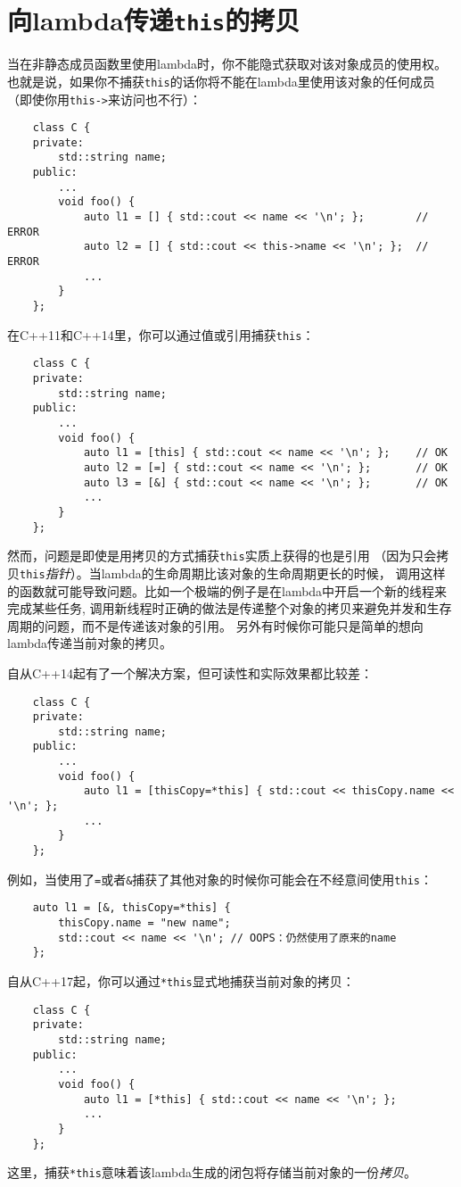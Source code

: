 \section{向lambda传递\texttt{this}的拷贝}
当在非静态成员函数里使用lambda时，你不能隐式获取对该对象成员的使用权。
也就是说，如果你不捕获\texttt{this}的话你将不能在lambda里使用该对象的任何成员
（即使你用\texttt{this->}来访问也不行）：
\begin{lstlisting}
    class C {
    private:
        std::string name;
    public:
        ...
        void foo() {
            auto l1 = [] { std::cout << name << '\n'; };        // ERROR
            auto l2 = [] { std::cout << this->name << '\n'; };  // ERROR
            ...
        }
    };
\end{lstlisting}
在C++11和C++14里，你可以通过值或引用捕获\texttt{this}：
\begin{lstlisting}
    class C {
    private:
        std::string name;
    public:
        ...
        void foo() {
            auto l1 = [this] { std::cout << name << '\n'; };    // OK
            auto l2 = [=] { std::cout << name << '\n'; };       // OK
            auto l3 = [&] { std::cout << name << '\n'; };       // OK
            ...
        }
    };
\end{lstlisting}
然而，问题是即使是用拷贝的方式捕获\texttt{this}实质上获得的也是引用
（因为只会拷贝\texttt{this}\emph{指针}）。当lambda的生命周期比该对象的生命周期更长的时候，
调用这样的函数就可能导致问题。比如一个极端的例子是在lambda中开启一个新的线程来完成某些任务,
调用新线程时正确的做法是传递整个对象的拷贝来避免并发和生存周期的问题，而不是传递该对象的引用。
另外有时候你可能只是简单的想向lambda传递当前对象的拷贝。

自从C++14起有了一个解决方案，但可读性和实际效果都比较差：
\begin{lstlisting}
    class C {
    private:
        std::string name;
    public:
        ...
        void foo() {
            auto l1 = [thisCopy=*this] { std::cout << thisCopy.name << '\n'; };
            ...
        }
    };
\end{lstlisting}
例如，当使用了\texttt{=}或者\texttt{\&}捕获了其他对象的时候你可能会在不经意间使用\texttt{this}：
\begin{lstlisting}
    auto l1 = [&, thisCopy=*this] {
        thisCopy.name = "new name";
        std::cout << name << '\n'; // OOPS：仍然使用了原来的name
    };
\end{lstlisting}
自从C++17起，你可以通过\texttt{*this}显式地捕获当前对象的拷贝：
\begin{lstlisting}
    class C {
    private:
        std::string name;
    public:
        ...
        void foo() {
            auto l1 = [*this] { std::cout << name << '\n'; };
            ...
        }
    };
\end{lstlisting}
这里，捕获\texttt{*this}意味着该lambda生成的闭包将存储当前对象的一份\emph{拷贝}。

